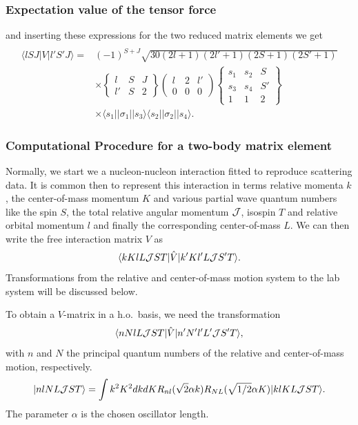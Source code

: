 \documentclass[compress]{beamer}
\newcommand*{\ket}[1]{|#1\rangle}
\newcommand*{\bra}[1]{\langle#1|}
\begin{document}
\frame
{
\frametitle{Expectation value of the tensor force}
\begin{small}
{\scriptsize
and inserting  these expressions for the two reduced matrix elements we get 
\[
\begin{array}{ll}
&\\
\bra{lSJ}V\ket{l'S'J} =&(-1)^{S+J}\sqrt{30(2l+1)(2l'+1)(2S+1)(2S'+1)}\\
&\times\left\{\begin{array}{ccc}l&S &J \\l'&S&2\end{array}\right\}
\left(\begin{array}{ccc}l&2&l'\\0&0&0\end{array}\right)
\left\{\begin{array}{ccc}s_{1}&s_{2}&S\\s_{3}&s_{4}&S'\\
1&1&2\end{array}
\right\}\\
&\times\bra{s_{1}}\left | \sigma_{1}\right | \ket{s_{3}}
\bra{s_{2}}\left | \sigma_{2}\right | \ket{s_{4}}.
\end{array}
\]
}
\end{small}
}





\frame
{
\frametitle{Computational Procedure for a two-body matrix element}
\begin{small}
{\scriptsize
Normally, we start we a nucleon-nucleon interaction fitted to reproduce scattering data.
It is common then to represent this interaction in terms relative momenta $k$, the center-of-mass momentum $K$
and various partial wave quantum numbers like the spin $S$, the total relative angular  momentum ${\cal J}$, isospin $T$ and relative orbital momentum $l$ and finally the corresponding center-of-mass $L$.  
We can then write the  free interaction matrix $V$ as
\[
    \bra{kKlL{\cal J}ST}\hat{V}\ket{k'Kl'L{\cal J}S'T}.\label{eq:freeg2}
\]
Transformations from the relative and center-of-mass motion
system to the lab system will be discussed
below.

To obtain a $V$-matrix in a h.o.~basis, we need  
the transformation
\[
     \bra{nNlL{\cal J}ST}\hat{V}\ket{n'N'l'L'{\cal J}S'T},
\]
with $n$ and $N$ the principal quantum numbers of the relative and
center-of-mass motion, respectively.
\[
   \ket{nlNL{\cal J}ST}= \int k^{2}K^{2}dkdKR_{nl}(\sqrt{2}\alpha k)
R_{NL}(\sqrt{1/2}\alpha K)
\ket{klKL{\cal J}ST}.
\]
The parameter $\alpha$ is the chosen oscillator length.
}
\end{small}
}
\end{document}
